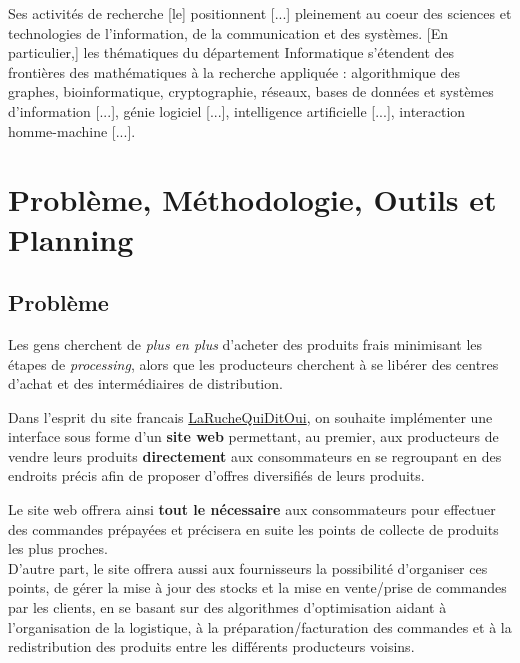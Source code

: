 \documentclass[a4paper,12pt]{book}
\theoremstyle{break}
\theoremstyle{break}
\theoremstyle{break}
\theoremstyle{break}
\theoremstyle{definition}
\theoremstyle{remark}
\begin{document}
Ses activités de recherche [le] positionnent [...] pleinement au coeur des sciences et technologies de l’information, de la communication et des systèmes. [En particulier,] les thématiques du département Informatique s’étendent des frontières des mathématiques à la recherche appliquée : algorithmique des graphes, bioinformatique, cryptographie, réseaux, bases de données et systèmes d'information [...], génie logiciel [...], intelligence artificielle [...], interaction homme-machine [...]. \fg{} \citep{lirmmPres}

\chapter{Problème, Méthodologie, Outils et Planning}
\section{Problème}
Les gens cherchent de \textit{plus en plus} d'acheter des produits frais minimisant les étapes de \textit{processing}, alors que les producteurs cherchent à se libérer des centres d’achat et des intermédiaires de distribution.

Dans l’esprit du site francais \href{https://laruchequiditoui.fr/fr}{LaRucheQuiDitOui}, on souhaite implémenter une interface sous forme d'un \textbf{site web} permettant, au premier, aux producteurs de vendre leurs produits \textbf{directement} aux consommateurs en se regroupant en des endroits précis afin de proposer d'offres diversifiés de leurs produits.

Le site web offrera ainsi \textbf{tout le nécessaire} aux consommateurs pour effectuer des commandes prépayées et précisera en suite les points de collecte de produits les plus proches.\\
D'autre part, le site offrera aussi aux fournisseurs la possibilité d'organiser ces points, de gérer la mise à jour des
stocks et la mise en vente/prise de commandes par les clients, en se basant sur des algorithmes d'optimisation aidant à l'organisation de la logistique, à la préparation/facturation des commandes et à la redistribution des produits entre les différents producteurs voisins.
\end{document}
